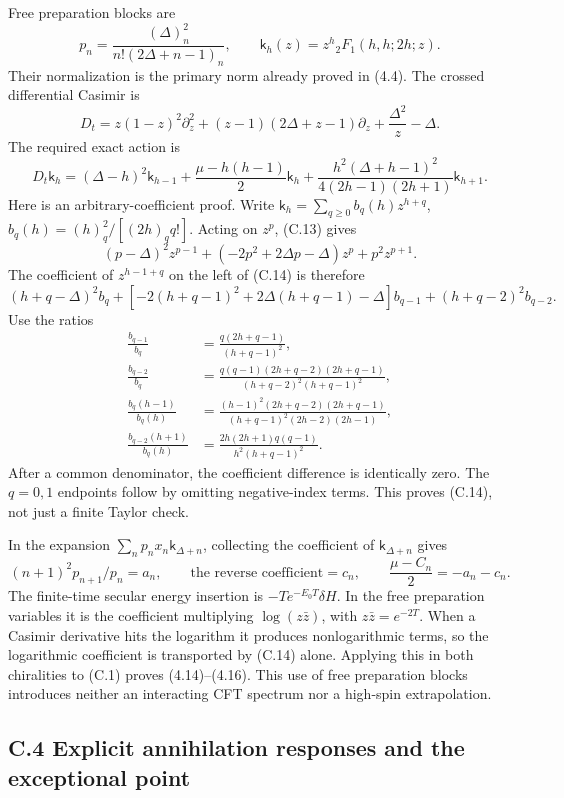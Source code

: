 Free preparation blocks are \[
p_n=\frac{(\Delta)_n^2}{n!(2\Delta+n-1)_n},
\qquad
\mathsf k_h(z)=z^h{}_2F_1(h,h;2h;z).
\tag{C.12}
\] Their normalization is the primary norm already proved in (4.4). The crossed differential Casimir is \[
D_t=z(1-z)^2\partial_z^2
+(z-1)(2\Delta+z-1)\partial_z+\frac{\Delta^2}{z}-\Delta .
\tag{C.13}
\] The required exact action is \[
D_t\mathsf k_h
=(\Delta-h)^2\mathsf k_{h-1}
+\frac{\mu-h(h-1)}2\mathsf k_h
+\frac{h^2(\Delta+h-1)^2}{4(2h-1)(2h+1)}\mathsf k_{h+1}.
\tag{C.14}
\] Here is an arbitrary-coefficient proof. Write \(\mathsf k_h=\sum_{q\ge0}b_q(h)z^{h+q}\), \(b_q(h)=(h)_q^2/[(2h)_q q!]\). Acting on \(z^p\), (C.13) gives \[
(p-\Delta)^2z^{p-1}
+(-2p^2+2\Delta p-\Delta)z^p+p^2z^{p+1}.
\] The coefficient of \(z^{h-1+q}\) on the left of (C.14) is therefore \[
(h+q-\Delta)^2b_q
+[-2(h+q-1)^2+2\Delta(h+q-1)-\Delta]b_{q-1}
+(h+q-2)^2b_{q-2}.
\] Use the ratios \[
\begin{aligned}
\frac{b_{q-1}}{b_q}
&=\frac{q(2h+q-1)}{(h+q-1)^2},\\
\frac{b_{q-2}}{b_q}
&=\frac{q(q-1)(2h+q-2)(2h+q-1)}
{(h+q-2)^2(h+q-1)^2},\\
\frac{b_q(h-1)}{b_q(h)}
&=\frac{(h-1)^2(2h+q-2)(2h+q-1)}
{(h+q-1)^2(2h-2)(2h-1)},\\
\frac{b_{q-2}(h+1)}{b_q(h)}
&=\frac{2h(2h+1)q(q-1)}
{h^2(h+q-1)^2}.
\end{aligned}
\tag{C.15}
\] After a common denominator, the coefficient difference is identically zero. The \(q=0,1\) endpoints follow by omitting negative-index terms. This proves (C.14), not just a finite Taylor check.

In the expansion \(\sum_np_nx_n\mathsf k_{\Delta+n}\), collecting the coefficient of \(\mathsf k_{\Delta+n}\) gives \[
(n+1)^2p_{n+1}/p_n=a_n,\qquad
\text{the reverse coefficient}=c_n,\qquad
\frac{\mu-C_n}{2}=-a_n-c_n .
\] The finite-time secular energy insertion is \(-T e^{-E_0T}\delta H\). In the free preparation variables it is the coefficient multiplying \(\log(z\bar z)\), with \(z\bar z=e^{-2T}\). When a Casimir derivative hits the logarithm it produces nonlogarithmic terms, so the logarithmic coefficient is transported by (C.14) alone. Applying this in both chiralities to (C.1) proves (4.14)--(4.16). This use of free preparation blocks introduces neither an interacting CFT spectrum nor a high-spin extrapolation.

\hypertarget{c.4-explicit-annihilation-responses-and-the-exceptional-point}{%
\subsection{C.4 Explicit annihilation responses and the exceptional point}\label{c.4-explicit-annihilation-responses-and-the-exceptional-point}}

